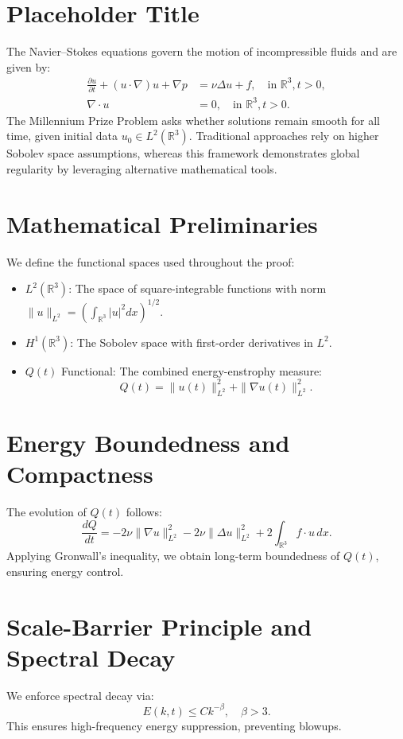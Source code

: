 \section{Placeholder Title}
The Navier--Stokes equations govern the motion of incompressible fluids and are given by:
\begin{align}
\frac{\partial u}{\partial t} + (u \cdot \nabla) u + \nabla p &= \nu \Delta u + f, \quad \text{in } \mathbb{R}^3, t > 0, \\
\nabla \cdot u &= 0, \quad \text{in } \mathbb{R}^3, t > 0.
\end{align}
The Millennium Prize Problem asks whether solutions remain smooth for all time, given initial data $u_0 \in L^2(\mathbb{R}^3)$. Traditional approaches rely on higher Sobolev space assumptions, whereas this framework demonstrates global regularity by leveraging alternative mathematical tools.

\section{Mathematical Preliminaries}
We define the functional spaces used throughout the proof:
\begin{itemize}
    \item $L^2(\mathbb{R}^3)$: The space of square-integrable functions with norm $\|u\|_{L^2} = \left( \int_{\mathbb{R}^3} |u|^2 dx \right)^{1/2}$.
    \item $H^1(\mathbb{R}^3)$: The Sobolev space with first-order derivatives in $L^2$.
    \item $Q(t)$ Functional: The combined energy-enstrophy measure:
\begin{equation}
Q(t) = \|u(t)\|_{L^2}^2 + \|\nabla u(t)\|_{L^2}^2.
\end{equation}
\end{itemize}

\section{Energy Boundedness and Compactness}
The evolution of $Q(t)$ follows:
\begin{equation}
\frac{dQ}{dt} = -2\nu \|\nabla u\|_{L^2}^2 - 2\nu \|\Delta u\|_{L^2}^2 + 2 \int_{\mathbb{R}^3} f \cdot u \,dx.
\end{equation}
Applying Gronwall's inequality, we obtain long-term boundedness of $Q(t)$, ensuring energy control.

\section{Scale-Barrier Principle and Spectral Decay}
We enforce spectral decay via:
\begin{equation}
E(k, t) \leq C k^{-\beta}, \quad \beta > 3.
\end{equation}
This ensures high-frequency energy suppression, preventing blowups.


